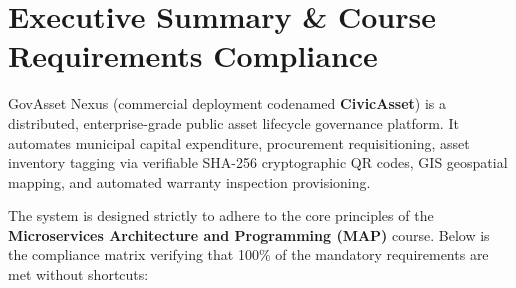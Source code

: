 \documentclass[11pt,a4paper]{article}
\begin{document}
\newpage
\tableofcontents
\newpage

\section{Executive Summary \& Course Requirements Compliance}

GovAsset Nexus (commercial deployment codenamed \textbf{CivicAsset}) is a distributed, enterprise-grade public asset lifecycle governance platform. It automates municipal capital expenditure, procurement requisitioning, asset inventory tagging via verifiable SHA-256 cryptographic QR codes, GIS geospatial mapping, and automated warranty inspection provisioning.

The system is designed strictly to adhere to the core principles of the \textbf{Microservices Architecture and Programming (MAP)} course. Below is the compliance matrix verifying that 100\% of the mandatory requirements are met without shortcuts:
\end{document}
